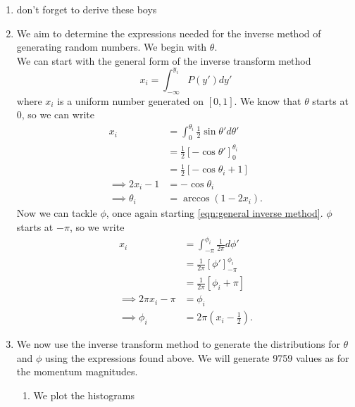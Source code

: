 \documentclass[11pt]{article}
\begin{document}
\begin{enumerate}
\begin{enumerate}
\begin{enumerate}
            \item The average $p$ was found to be \SI{5.9985}{\mega\electronvolt}.
            
        \end{enumerate}

        \item don't forget to derive these boys
        
        \item We aim to determine the expressions needed for the inverse method of generating random numbers. We begin with $\theta$.\\
        We can start with the general form of the inverse transform method
        \begin{equation}
            x_i=\int_{-\infty}^{y_i}P(y')dy'
            \label{eqn:general inverse method}
        \end{equation}
        where $x_i$ is a uniform number generated on $[0,1]$. We know that $\theta$ starts at 0, so we can write
        \begin{align*}
            x_i&=\int_0^{\theta_i}\frac 12 \sin\theta' d\theta'\\
            &=\frac 12 \left[-\cos\theta'\right]_0^{\theta_i}\\
            &=\frac 12 [-\cos\theta_i+1]\\
            \implies 2x_i-1&=-\cos\theta_i\\
            \implies \theta_i&=\arccos(1-2x_i).
        \end{align*}
        Now we can tackle $\phi$, once again starting \cref{eqn:general inverse method}. $\phi$ starts at $-\pi$, so we write
        \begin{align*}
            x_i&=\int_{-\pi}^{\phi_i}\frac{1}{2\pi}d\phi'\\
            &=\frac{1}{2\pi}[\phi']_{-\pi}^{\phi_i}\\
            &=\frac{1}{2\pi}[\phi_i+\pi]\\
            \implies2\pi x_i -\pi&=\phi_i\\
            \implies \phi_i &= 2\pi\left(x_i-\frac 12\right).
        \end{align*}

        \item We now use the inverse transform method to generate the distributions for $\theta$ and $\phi$ using the expressions found above. We will generate \num{9759} values as for the momentum magnitudes.
        \begin{enumerate}
            \item We plot the histograms
            

\end{enumerate}
\end{enumerate}
\end{enumerate}
\end{document}

